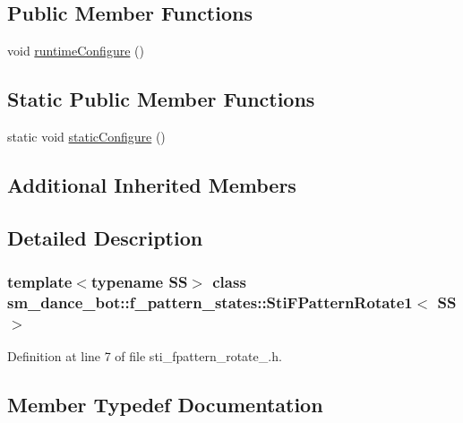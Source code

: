 \subsection*{Public Member Functions}
\begin{DoxyCompactItemize}
\item 
void \hyperlink{structsm__dance__bot_1_1f__pattern__states_1_1StiFPatternRotate1_a223d823a2d253e08f2dcb598cd81510a}{runtime\+Configure} ()
\end{DoxyCompactItemize}
\subsection*{Static Public Member Functions}
\begin{DoxyCompactItemize}
\item 
static void \hyperlink{structsm__dance__bot_1_1f__pattern__states_1_1StiFPatternRotate1_a69cb2d12bd7d0e0257a524a3ccf9a435}{static\+Configure} ()
\end{DoxyCompactItemize}
\subsection*{Additional Inherited Members}


\subsection{Detailed Description}
\subsubsection*{template$<$typename SS$>$\newline
class sm\+\_\+dance\+\_\+bot\+::f\+\_\+pattern\+\_\+states\+::\+Sti\+F\+Pattern\+Rotate1$<$ S\+S $>$}



Definition at line 7 of file sti\+\_\+fpattern\+\_\+rotate\+\_.\+h.



\subsection{Member Typedef Documentation}
\mbox{\label{structsm__dance__bot_1_1f__pattern__states_1_1StiFPatternRotate1_a7251b025614a0119a968d40c928ffd59}} 

